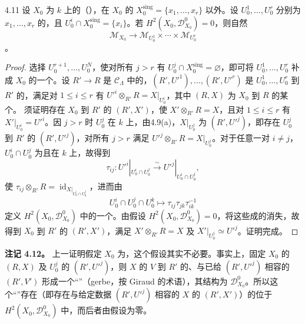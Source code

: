 \begin{SGAresult}{}{4.11}
设 $X_0$ 为 $k$ 上的（），在 $X_0$ 的 $X_0^{\mathrm{sing}}=\{x_1,\ldots,x_r\}$ 以外。设 $U_0^1,\ldots,U_0^r$ 分别为 $x_1,\ldots,x_r$ 的，且 $U_0^i\cap X_0^{\mathrm{sing}}=\{x_i\}$。若 $H^2(X_0,\mathcal D^0_{X_0})=0$，则自然
\[
\mathcal M_{X_0}\longrightarrow\mathcal M_{U_0^1}\times\cdots\times\mathcal M_{U_0^r}
\]
。
\end{SGAresult}
\begin{proof}
选择 $U_0^{r+1},\ldots,U_0^N$，使对所有 $j>r$ 有 $U_0^j\cap X_0^{\mathrm{sing}}=\varnothing$，即可将 $U_0^1,\ldots,U_0^r$ 补成 $X_0$ 的一个。设 $R'\to R$ 是 $\mathcal C_\Lambda$ 中的，$(R',U'^1),\ldots,(R',U'^r)$ 是 $U_0^1,\ldots,U_0^r$ 到 $R'$ 的，满足对 $1\leq i\leq r$ 有 $U'^i\otimes_{R'}R=X|_{U_0^i}$，其中 $(R,X)$ 为 $X_0$ 到 $R$ 的某个。
须证明存在 $X_0$ 到 $R'$ 的 $(R',X')$，使 $X'\otimes_{R'}R=X$，且对 $1\leq i\leq r$ 有 $X'|_{U_0^i}=U'^i$。因 $j>r$ 时 $U_0^j$ 在 $k$ 上，由4.9(a)，$X|_{U_0^j}$ 为 $(R',U'^j)$，即存在 $U_0^j$ 到 $R'$ 的 $(R',U'^j)$，对所有 $j>r$ 满足 $U'^j\otimes_{R'}R=X|_{U_0^j}$。对于任意一对 $i\ne j$，$U_0^i\cap U_0^j$ 为且在 $k$ 上，故得到
\[
\tau_{ij}:U'^i|_{U_0^i\cap U_0^j}\xrightarrow\sim U'^j|_{U_0^i\cap U_0^j},
\]
使 $\tau_{ij}\otimes_{R'}R=\operatorname{id}_{X|_{U_0^i\cap U_0^j}}$，进而由
\[
U_0^i\cap U_0^j\cap U_0^k\longmapsto\tau_{ij}\tau_{jk}\tau_{ik}^{-1}
\]
定义 $H^2(X_0,\mathcal D^0_{X_0})$ 中的一个。由假设 $H^2(X_0,\mathcal D^0_{X_0})=0$，将这些成的消失，故得到 $X_0$ 到 $R'$ 的 $(R',X')$，满足 $X'\otimes_{R'}R=X$ 及 $X'|_{U_0^j}\simeq U'^j$。证明完成。
\end{proof}

\textbf{注记 4.12。} 上一证明假定 $X_0$ 为，这个假设其实不必要。事实上，固定 $X_0$ 的 $(R,X)$ 及 $U_0^j$ 的 $(R',U'^j)$，则 $X$ 的 $V$ 到 $R'$ 的、与已给 $(R',U'^j)$ 相容的 $(R',V')$ 形成一个“”（gerbe，按 Giraud 的术语），其结构为 $\mathcal D^0_{X_0}$。所以这个“”存在（即存在与给定数据 $(R',U'^j)$ 相容的 $X$ 的 $(R',X')$）的位于 $H^2(X_0,\mathcal D^0_{X_0})$ 中，而后者由假设为零。

